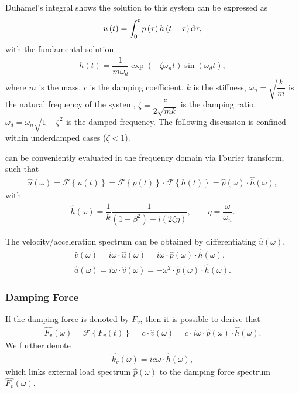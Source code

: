 Duhamel's integral shows the solution to this system can be expressed as
\begin{gather}\label{eq:duhamel}
u\left(t\right)=\int_{0}^{t}p\left(\tau\right)h\left(t-\tau\right)\mathrm{d}\tau,
\end{gather}
with the fundamental solution
\begin{gather}
h\left(t\right)=\dfrac{1}{m\omega_d}\exp\left(-\zeta\omega_nt\right)\sin\left(\omega_dt\right),
\end{gather}
where $m$ is the mass, $c$ is the damping coefficient, $k$ is the stiffness, $\omega_n=\sqrt{\dfrac{k}{m}}$ is the natural frequency of the system, $\zeta=\dfrac{c}{2\sqrt{mk}}$ is the damping ratio, $\omega_d=\omega_n\sqrt{1-\zeta^2}$ is the damped frequency. The following discussion is confined within underdamped cases ($\zeta<1$).

 can be conveniently evaluated in the frequency domain via Fourier transform, such that
\begin{gather}
\hat{u}\left(\omega\right)=\mathscr{F}\left\{u\left(t\right)\right\}=\mathscr{F}\left\{p\left(t\right)\right\}\cdot\mathscr{F}\left\{h\left(t\right)\right\}=\hat{p}\left(\omega\right)\cdot\hat{h}\left(\omega\right),
\end{gather}
with
\begin{gather}\label{eq:analytical_transfer}
\hat{h}\left(\omega\right)=\dfrac{1}{k}\dfrac{1}{\left(1-\beta^2\right)+i\left(2\zeta\eta\right)},\qquad\eta=\dfrac{\omega}{\omega_n}.
\end{gather}

The velocity/acceleration spectrum can be obtained by differentiating $\hat{u}\left(\omega\right)$,
\begin{gather}
\hat{v}\left(\omega\right)=i\omega\cdot{}\hat{u}\left(\omega\right)=i\omega\cdot{}\hat{p}\left(\omega\right)\cdot\hat{h}\left(\omega\right),\\
\hat{a}\left(\omega\right)=i\omega\cdot{}\hat{v}\left(\omega\right)=-\omega^2\cdot{}\hat{p}\left(\omega\right)\cdot\hat{h}\left(\omega\right).
\end{gather}
\subsubsection{Damping Force}
If the damping force is denoted by $F_v$, then it is possible to derive that
\begin{gather}
\hat{F_v}\left(\omega\right)=\mathscr{F}\left\{F_v\left(t\right)\right\}=c\cdot{}\hat{v}\left(\omega\right)=c\cdot{}i\omega\cdot{}\hat{p}\left(\omega\right)\cdot\hat{h}\left(\omega\right).
\end{gather}
We further denote
\begin{gather}
\hat{k_v}\left(\omega\right)=ic\omega\cdot\hat{h}\left(\omega\right),
\end{gather}
which links external load spectrum $\hat{p}\left(\omega\right)$ to the damping force spectrum $\hat{F_v}\left(\omega\right)$.


